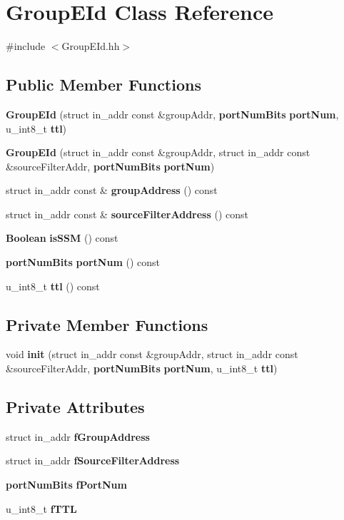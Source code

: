 \section{Group\+E\+Id Class Reference}
\label{classGroupEId}


{\ttfamily \#include $<$Group\+E\+Id.\+hh$>$}

\subsection*{Public Member Functions}
\begin{DoxyCompactItemize}
\item 
{\bf Group\+E\+Id} (struct in\+\_\+addr const \&group\+Addr, {\bf port\+Num\+Bits} {\bf port\+Num}, u\+\_\+int8\+\_\+t {\bf ttl})
\item 
{\bf Group\+E\+Id} (struct in\+\_\+addr const \&group\+Addr, struct in\+\_\+addr const \&source\+Filter\+Addr, {\bf port\+Num\+Bits} {\bf port\+Num})
\item 
struct in\+\_\+addr const \& {\bf group\+Address} () const 
\item 
struct in\+\_\+addr const \& {\bf source\+Filter\+Address} () const 
\item 
{\bf Boolean} {\bf is\+S\+S\+M} () const 
\item 
{\bf port\+Num\+Bits} {\bf port\+Num} () const 
\item 
u\+\_\+int8\+\_\+t {\bf ttl} () const 
\end{DoxyCompactItemize}
\subsection*{Private Member Functions}
\begin{DoxyCompactItemize}
\item 
void {\bf init} (struct in\+\_\+addr const \&group\+Addr, struct in\+\_\+addr const \&source\+Filter\+Addr, {\bf port\+Num\+Bits} {\bf port\+Num}, u\+\_\+int8\+\_\+t {\bf ttl})
\end{DoxyCompactItemize}
\subsection*{Private Attributes}
\begin{DoxyCompactItemize}
\item 
struct in\+\_\+addr {\bf f\+Group\+Address}
\item 
struct in\+\_\+addr {\bf f\+Source\+Filter\+Address}
\item 
{\bf port\+Num\+Bits} {\bf f\+Port\+Num}
\item 
u\+\_\+int8\+\_\+t {\bf f\+T\+T\+L}
\end{DoxyCompactItemize}


